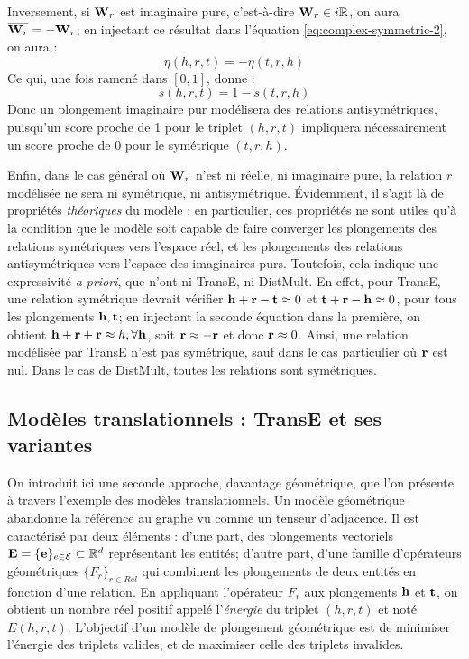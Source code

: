 Inversement, si $\bf{W}_r$ est imaginaire pure, c'est-à-dire $\bf{W}_r \in i\R$, on aura $\compconj{\bf{W}_r} = - \bf{W}_r$; en injectant ce résultat dans l'équation \ref{eq:complex-symmetric-2}, on aura :
\begin{equation}
    \eta(h, r, t) = - \eta(t, r, h)
\end{equation}
Ce qui, une fois ramené dans $[0, 1]$, donne :
\begin{equation}
    s(h, r, t) = 1 - s(t, r, h)
\end{equation}
Donc un plongement imaginaire pur modélisera des relations antisymétriques, puisqu'un score proche de 1 pour le triplet $(h, r, t)$ impliquera nécessairement un score proche de 0 pour le symétrique $(t, r, h)$.

Enfin, dans le cas général où $\bf{W}_r$ n'est ni réelle, ni imaginaire pure, la relation $r$ modélisée ne sera ni symétrique, ni antisymétrique. Évidemment, il s'agit là de propriétés \textit{théoriques} du modèle : en particulier, ces propriétés ne sont utiles qu'à la condition que le modèle soit capable de faire converger les plongements des relations symétriques vers l'espace réel, et les plongements des relations antisymétriques vers l'espace des imaginaires purs. Toutefois, cela indique une expressivité \textit{a priori}, que n'ont ni TransE, ni DistMult. En effet, pour TransE, une relation symétrique devrait vérifier $\bf{h + r - t} \approx 0$ et $\bf{t + r - h} \approx 0$, pour tous les plongements $\bf{h, t}$; en injectant la seconde équation dans la première, on obtient $\bf{h + r + r} \approx h, \forall \bf{h}$, soit $\bf{r \approx -r}$ et donc $\bf{r} \approx 0$. Ainsi,  une relation modélisée par TransE n'est pas symétrique, sauf dans le cas particulier où $\bf{r}$ est nul. Dans le cas de DistMult, toutes les relations sont symétriques.


\subsection{Modèles translationnels : TransE et ses variantes}
\label{subsec:kge-models-transx}

On introduit ici une seconde approche, davantage géométrique, que l'on présente à travers l'exemple des modèles translationnels. Un modèle géométrique abandonne la référence au graphe vu comme un tenseur d'adjacence. Il est caractérisé par deux éléments : d'une part, des plongements vectoriels $\bf{E} = \{ \bf{e} \}_{e \in \Ent} \subset \R^d$ représentant les entités; d'autre part, d'une famille d'opérateurs géométriques $\{ F_r \}_{r \in Rel}$ qui combinent les plongements de deux entités en fonction d'une relation. En appliquant l'opérateur $F_r$ aux plongements $\bf{h}$ et $\bf{t}$, on obtient un nombre réel positif appelé l'\textit{énergie} du triplet $(h, r, t)$ et noté $E(h, r, t)$. L'objectif d'un modèle de plongement géométrique est de minimiser l'énergie des triplets valides, et de maximiser celle des triplets invalides.

